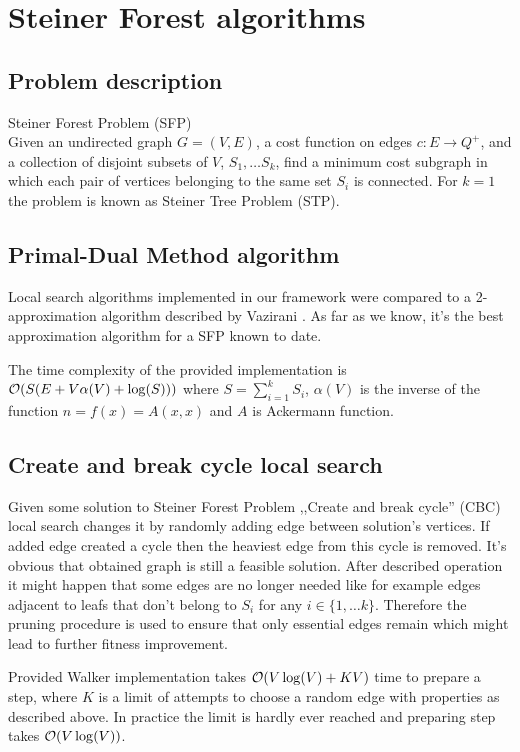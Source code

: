 \chapter{Steiner Forest algorithms}

\section{Problem description}
Steiner Forest Problem (SFP)\\
Given an undirected graph $G = (V, E)$, a cost function on edges $c : E \rightarrow Q^+$, and a collection of disjoint subsets of $V$, $S_1, \dots S_k$, find a minimum cost subgraph in which each pair of vertices belonging to the same set $S_i$ is connected.
For $k = 1$ the problem is known as Steiner Tree Problem (STP).

\section{Primal-Dual Method algorithm}
Local search algorithms implemented in our framework were compared to a 2-approximation algorithm described by Vazirani \cite{Vazirani}. As far as we know, it's the best approximation algorithm for a SFP known to date.

The time complexity of the provided implementation is $\mathcal{O}(S(E + V\alpha(V) + \log(S)))$ where $S = \sum_{i = 1}^{k}S_i$, $\alpha(V)$ is the inverse of the function $n = f(x) = A(x, x)$ and $A$ is Ackermann function.

\section{Create and break cycle local search}
Given some solution to Steiner Forest Problem ,,Create and break cycle'' (CBC) local search changes it by randomly adding edge between solution's vertices. If added edge created a cycle then the heaviest edge from this cycle is removed. It's obvious that obtained graph is still a feasible solution. After described operation it might happen that some edges are no longer needed like for example edges adjacent to leafs that don't belong to $S_i$ for any $i \in \{1, \dots k\}$. Therefore the pruning procedure is used to ensure that only essential edges remain which might lead to further fitness improvement.

Provided Walker implementation takes $\mathcal{O}(V\log(V) + KV)$ time to prepare a step, where $K$ is a limit of attempts to choose a random edge with properties as described above. In practice the limit is hardly ever reached and preparing step takes $\mathcal{O}(V\log(V))$.


